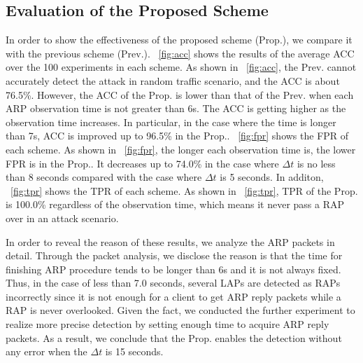 \documentclass[paper]{ieice}
\begin{document}
\subsection{Evaluation of the Proposed Scheme}
In order to show the effectiveness of the proposed scheme (Prop.), we compare it with the previous scheme \cite{previous} (Prev.).
\figurename~\ref{fig:acc} shows the results of the average ACC over the 100 experiments in each scheme.
As shown in \figurename~\ref{fig:acc}, the Prev. cannot accurately detect the attack in random traffic scenario, and the ACC is about 76.5\%.
However, the ACC of the Prop. is lower than that of the Prev. when each ARP observation time is not greater than 6s.
The ACC is getting higher as the observation time increases.
In particular, in the case where the time is longer than 7s, ACC is improved up to 96.5\% in the Prop..
\figurename~\ref{fig:fpr} shows the FPR of each scheme.
As shown in \figurename~\ref{fig:fpr}, the longer each observation time is, the lower FPR is in the Prop..
It decreases up to 74.0\% in the case where $\Delta t$ is no less than 8 seconds compared with the case where $\Delta t$ is 5 seconds.
In additon, \figurename~\ref{fig:tpr} shows the TPR of each scheme.
As shown in \figurename~\ref{fig:tpr}, TPR of the Prop. is 100.0\% regardless of the observation time, which means it never pass a RAP over in an attack scenario.

In order to reveal the reason of these results, we analyze the ARP packets in detail.
Through the packet analysis, we disclose the reason is that the time for finishing ARP procedure tends to be longer than 6s and it is not always fixed.
Thus, in the case of less than 7.0 seconds, several LAPs are detected as RAPs incorrectly since it is not enough for a client to get ARP reply packets while a RAP is never overlooked.
Given the fact, we conducted the further experiment to realize more precise detection by setting enough time to acquire ARP reply packets.
As a result, we conclude that the Prop. enables the detection without any error when the $\Delta t$ is 15 seconds.
\end{document}
